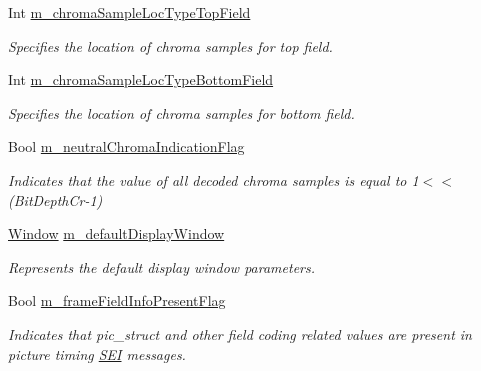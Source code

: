 \begin{DoxyCompactItemize}
Int \hyperlink{class_t_enc_cfg_a53b6c072a4dd9e4bc1953203688395c6}{m\+\_\+chroma\+Sample\+Loc\+Type\+Top\+Field}
\begin{DoxyCompactList}\small\item\em Specifies the location of chroma samples for top field. \end{DoxyCompactList}\item 
\mbox{\label{class_t_enc_cfg_a20e801ac03217dcbd35ff5647835b55b}} 
Int \hyperlink{class_t_enc_cfg_a20e801ac03217dcbd35ff5647835b55b}{m\+\_\+chroma\+Sample\+Loc\+Type\+Bottom\+Field}
\begin{DoxyCompactList}\small\item\em Specifies the location of chroma samples for bottom field. \end{DoxyCompactList}\item 
\mbox{\label{class_t_enc_cfg_a0c90b63f98e47e38acc8792c6aa83d87}} 
Bool \hyperlink{class_t_enc_cfg_a0c90b63f98e47e38acc8792c6aa83d87}{m\+\_\+neutral\+Chroma\+Indication\+Flag}
\begin{DoxyCompactList}\small\item\em Indicates that the value of all decoded chroma samples is equal to 1$<$$<$(Bit\+Depth\+Cr-\/1) \end{DoxyCompactList}\item 
\mbox{\label{class_t_enc_cfg_a1306391fbb4b7caef393f4267ddf23e0}} 
\hyperlink{class_window}{Window} \hyperlink{class_t_enc_cfg_a1306391fbb4b7caef393f4267ddf23e0}{m\+\_\+default\+Display\+Window}
\begin{DoxyCompactList}\small\item\em Represents the default display window parameters. \end{DoxyCompactList}\item 
\mbox{\label{class_t_enc_cfg_add618c255e2f3c90d89a1e851a363937}} 
Bool \hyperlink{class_t_enc_cfg_add618c255e2f3c90d89a1e851a363937}{m\+\_\+frame\+Field\+Info\+Present\+Flag}
\begin{DoxyCompactList}\small\item\em Indicates that pic\+\_\+struct and other field coding related values are present in picture timing \hyperlink{class_s_e_i}{S\+EI} messages. \end{DoxyCompactList}\item 

\end{DoxyCompactItemize}
